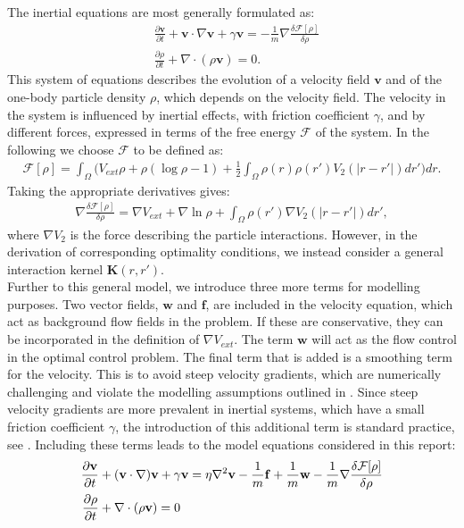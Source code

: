 \documentclass[11pt, a4paper]{article}
\theoremstyle{definition}
\newcommand{\Sta}{\rho}
\newcommand{\Stav}{\mathbf{v}}
\newcommand{\Con}{\mathbf{f}}
\begin{document}
The inertial equations are most generally formulated as:
\begin{align*}
	&\frac{\partial \Stav}{\partial t} + \Stav \cdot \nabla \Stav + \gamma \Stav = - \frac{1}{m} \nabla \frac{\delta \mathcal{F}[\Sta]}{\delta \Sta}\\
	&\frac{\partial \Sta}{\partial t} + \nabla \cdot (\Sta \Stav) =0.
\end{align*}
This system of equations describes the evolution of a velocity field $\Stav$ and of the one-body particle density $\Sta$, which depends on the velocity field.
The velocity in the system is influenced by inertial effects, with friction coefficient $\gamma$, and by different forces, expressed in terms of the free energy $\mathcal{F}$ of the system.
In the following we choose $\mathcal{F}$ to be defined as:
\begin{align*}
\mathcal{F}[\Sta]=\int_\Omega  \bigg( V_{ext}\Sta + \Sta (\log \Sta -1) +  \frac{1}{2}\int_\Omega \Sta(r) \Sta(r')V_2(|r-r'|)dr' \bigg) dr.
\end{align*}
Taking the appropriate derivatives gives:
\begin{align*}
 \nabla \frac{\delta \mathcal{F}[\Sta]}{\delta \Sta} = \nabla V_{ext} + \nabla \ln \Sta + \int_\Omega \Sta(r') \nabla V_2(|r-r'|)dr',
\end{align*}
where $\nabla V_2$ is the force describing the particle interactions. However, in the derivation of corresponding optimality conditions, we instead consider a general interaction kernel $\mathbf{K}(r,r')$.
\\
Further to this general model, we introduce three more terms for modelling purposes. Two vector fields, $\mathbf{w}$ and $\Con$, are included in the velocity equation, which act as background flow fields in the problem. If these are conservative, they can be incorporated in the definition of $\nabla V_{ext}$. The term $\mathbf{w}$ will act as the flow control in the optimal control problem.
The final term that is added is a smoothing term for the velocity. This is to avoid steep velocity gradients, which are numerically challenging and violate the modelling assumptions outlined in \cite{Archer1}. Since steep velocity gradients are more prevalent in inertial systems, which have a small friction coefficient $\gamma$, the introduction of this additional term is standard practice, see \cite{Archer1}.
Including these terms leads to the model equations considered in this report:
\begin{align}
\label{eqn:INeqns1}
\frac{\partial \Stav}{\partial t} &+ (\Stav \cdot \nabla)\Stav + \gamma \Stav=\eta \nabla^2 \Stav  -\frac{1}{m}\Con +\frac{1}{m}\mathbf{w} - \frac{1}{m}\nabla \frac{\delta \mathcal{F}[\Sta]}{\delta \Sta}\\
\frac{\partial \Sta}{\partial t} &+ \nabla \cdot (\Sta \Stav)=0 \notag
\end{align}
\end{document}
